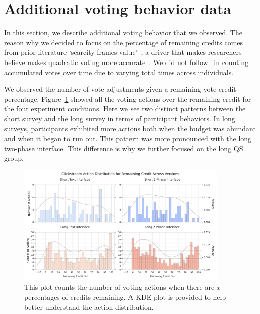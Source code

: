 \section{Additional voting behavior data}
\label{apdx:additional_results_behavior}
In this section, we describe additional voting behavior that we observed. The reason why we decided to focus on the percentage of remaining credits comes from prior literature `scarcity frames value'~\cite{Shah2015a}, a driver that makes researchers believe makes quadratic voting more accurate~\cite{chengCanShowWhat2021}. We did not follow~\citet{quarfoot2017quadratic} in counting accumulated votes over time due to varying total times across individuals.

We observed the number of vote adjustments given a remaining vote credit percentage. Figure~\ref{apdxfig:voting_all} showed all the voting actions over the remaining credit for the four experiment conditions. Here we see two distinct patterns between the short survey and the long survey in terms of participant behaviors. In long surveys, participants exhibited more actions both when the budget was abundant and when it began to run out. This pattern was more pronounced with the long two-phase interface. This difference is why we further focused on the long QS group.

\begin{figure}[p]
    \centering
    \includegraphics[width=0.9\textwidth]{content/image/results/clickstream_action_distribution.pdf}
    \caption{This plot counts the number of voting actions when there are $x$ percentages of credits remaining. A KDE plot is provided to help better understand the action distribution.}
    \label{apdxfig:voting_all}
\end{figure}

